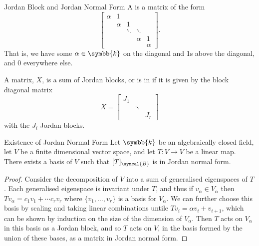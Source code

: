 \documentclass[fleqn]{NotesClass}
\renewcommand{\field}{\symbb{k}}
\newcommand{\basis}{\symcal{B}}
\begin{document}
    \begin{dfn}{Jordan Block and Jordan Normal Form}{}
        A  is a matrix of the form
        \begin{equation}
            \begin{bmatrix}
                \alpha & 1 \\
                & \alpha & 1 \\
                & & \ddots & \ddots\\
                & & & \alpha & 1\\
                & & & & \alpha
            \end{bmatrix}
            .
        \end{equation}
        That is, we have some \(\alpha \in \field\) on the diagonal and 1s above the diagonal, and 0 everywhere else.
        
        A matrix, \(X\), is a sum of Jordan blocks, or is in  if it is given by the block diagonal matrix
        \begin{equation}
            X = 
            \begin{bmatrix}
                J_1\\
                & \ddots \\
                & & J_r
            \end{bmatrix}
        \end{equation}
        with the \(J_i\) Jordan blocks.
    \end{dfn}
    
    \begin{crl}{Existence of Jordan Normal Form}{}
        Let \(\field\) be an algebraically closed field, let \(V\) be a finite dimensional vector space, and let \(T \colon V \to V\) be a linear map.
        There exists a basis of \(V\) such that \([T]_{\basis}\) is in Jordan normal form.
        \begin{proof}
            Consider the decomposition of \(V\) into a sum of generalised eigenspaces of \(T\).
            Each generalised eigenspace is invariant under \(T\), and thus if \(v_\alpha \in V_\alpha\) then \(Tv_\alpha = c_1v_1 + \dotsb c_rv_r\) where \(\{v_1, \dotsc, v_r\}\) is a basis for \(V_\alpha\).
            We can further choose this basis by scaling and taking linear combinations untile \(Tv_{i} = \alpha v_i + v_{i+1}\), which can be shown by induction on the size of the dimension of \(V_\alpha\).
            Then \(T\) acts on \(V_\alpha\) in this basis as a Jordan block, and so \(T\) acts on \(V\), in the basis formed by the union of these bases, as a matrix in Jordan normal form.
        \end{proof}
    \end{crl}
    
\end{document}

